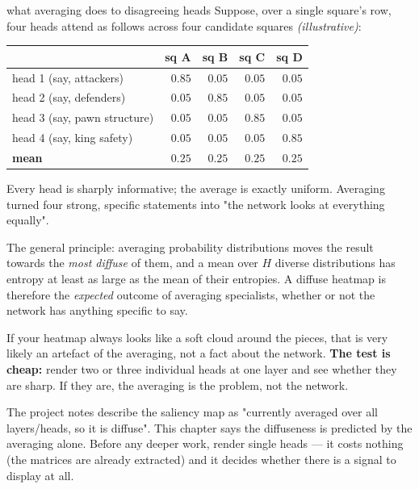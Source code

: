 \begin{worked}{what averaging does to disagreeing heads}
Suppose, over a single square's row, four heads attend as follows across four candidate
squares \emph{(illustrative)}:
\begin{center}
\begin{tabular}{@{}lrrrr@{}}
\toprule
 & sq A & sq B & sq C & sq D \\
\midrule
head 1 (say, attackers) & $0.85$ & $0.05$ & $0.05$ & $0.05$ \\
head 2 (say, defenders) & $0.05$ & $0.85$ & $0.05$ & $0.05$ \\
head 3 (say, pawn structure) & $0.05$ & $0.05$ & $0.85$ & $0.05$ \\
head 4 (say, king safety) & $0.05$ & $0.05$ & $0.05$ & $0.85$ \\
\midrule
\textbf{mean} & $\mathbf{0.25}$ & $\mathbf{0.25}$ & $\mathbf{0.25}$ & $\mathbf{0.25}$ \\
\bottomrule
\end{tabular}
\end{center}
Every head is sharply informative; the average is exactly uniform. Averaging turned four
strong, specific statements into "the network looks at everything equally".
\end{worked}

The general principle: averaging probability distributions moves the result towards the
\emph{most diffuse} of them, and a mean over $H$ diverse distributions has entropy at least as
large as the mean of their entropies. A diffuse heatmap is therefore the \emph{expected}
outcome of averaging specialists, whether or not the network has anything specific to say.

\begin{keyidea}
If your heatmap always looks like a soft cloud around the pieces, that is very likely an
artefact of the averaging, not a fact about the network. \textbf{The test is cheap:} render
two or three individual heads at one layer and see whether they are sharp. If they are, the
averaging is the problem, not the network.
\end{keyidea}

\begin{repobox}[title={in this repository}]
The project notes describe the saliency map as "currently averaged over all layers/heads, so
it is diffuse". This chapter says the diffuseness is predicted by the averaging alone. Before
any deeper work, render single heads --- it costs nothing (the matrices are already extracted)
and it decides whether there is a signal to display at all.
\end{repobox}

